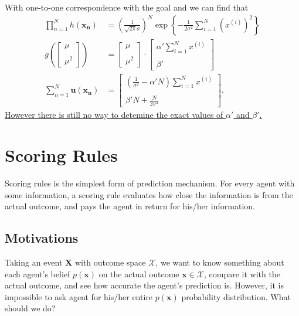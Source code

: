 \documentclass[12pt]{article}
\begin{document}
With one-to-one correspondence with the goal and we can find that 
\begin{align*}
    \prod_{n=1}^N h(\mathbf{x_n})&=\left( \frac{1}{\sqrt{2\pi}\sigma} \right)^N\exp\left\{ -\frac{1}{2\sigma^2}\sum_{i=1}^N\left( x^{(i)} \right)^2\right\}\\
    g\left( \begin{bmatrix}
        \mu\\~\\\mu^2
    \end{bmatrix} \right)&=\begin{bmatrix}
        \mu\\~\\\mu^2
    \end{bmatrix}\cdot\begin{bmatrix}
        \alpha'\sum_{i=1}^N x^{(i)}\\~\\\beta'
    \end{bmatrix}\\
    \sum_{n=1}^N\mathbf{u}(\mathbf{x_n})&=\begin{bmatrix}
        \left( \frac{1}{\sigma^2}-\alpha'N \right)\sum_{i=1}^N x^{(i)}\\
        ~\\
        \beta'N+\frac{N}{2\sigma^2}
    \end{bmatrix}.
\end{align*}
\ul{However there is still no way to detemine the exact values of $\alpha'$ and $\beta'$.}

\newpage
\section{Scoring Rules}
Scoring rules is the simplest form of prediction mechanism. For every agent with some information, a scoring rule evaluates how close the information is from the actual outcome, and pays the agent in return for his/her information.

\subsection{Motivations}
Taking an event $\mathbf{X}$ with outcome space $\mathcal{X}$, we want to know something about each agent's belief $p(\mathbf{x})$ on the actual outcome $\mathbf{x}\in \mathcal{X}$, compare it with the actual outcome, and see how accurate the agent's prediction is. However, it is impossible to ask agent for his/her entire $p(\mathbf{x})$ probability distribution. What should we do?
\end{document}
